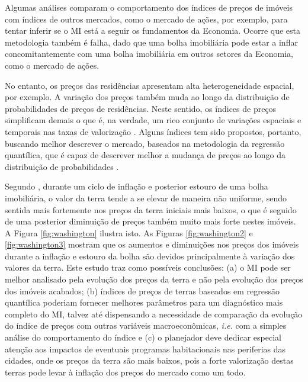 \documentclass[
	12pt,				%
	oneside,			%
	a4paper,			%
	chapter=TITLE,		%
	section=TITLE,		%
	english,			%
	brazil				%
	]{abntex2}
\begin{document}
\begin{refsection}
Algumas análises comparam o comportamento dos índices de preços de imóveis com
índices de outros mercados, como o mercado de ações, por exemplo, para tentar
inferir se o \gls{MI} está a seguir os fundamentos da Economia. Ocorre que esta
metodologia também é falha, dado que uma bolha imobiliária pode estar a inflar
concomitantemente com uma bolha imobiliária em outros setores da Economia, como
o mercado de ações.

No entanto, os preços das residências apresentam alta heterogeneidade espacial,
por exemplo. A variação dos preços também muda ao longo da distribuição de
probabilidades de preços de residências. Neste sentido, os índices de preços
simplificam demais o que é, na verdade, um rico conjunto de variações espaciais
e temporais nas taxas de valorização \autocite{McMillen2014LocalQH}. Alguns índices tem
sido propostos, portanto, buscando melhor descrever o mercado, baseados na
metodologia da regressão quantílica, que é capaz de descrever melhor a mudança
de preços ao longo da distribuição de probabilidades \autocites[ver][]{Wen}{ZHANG201785}{Coulson}.

Segundo \textcite[pp.~16-17]{washington}, durante um ciclo de inflação e posterior
estouro de uma bolha imobiliária, o valor da terra tende a
se elevar de maneira não uniforme, sendo sentida mais fortemente nos preços da
terra iniciais mais baixos, o que é seguido de uma posterior diminuição de
preços também muito mais forte nestes imóveis. A Figura \ref{fig:washington}
ilustra isto. As Figuras \ref{fig:washington2} e \ref{fig:washington3} mostram
que os aumentos e diminuições nos preços dos imóveis durante a inflação e
estouro da bolha são devidos principalmente à variação dos valores da terra.
Este estudo traz como possíveis conclusões: (a) o \gls{MI} pode ser melhor
analisado pela evolução dos preços da terra e não pela evolução dos preços dos
imóveis acabados; (b) índices de preços de terras baseados em regressão
quantílica poderiam fornecer melhores parâmetros para um diagnóstico mais
completo do \gls{MI}, talvez até dispensando a necessidade de comparação da
evolução do índice de preços com outras variáveis macroeconômicas, \emph{i.e.} com a
simples análise do comportamento do índice e (c) o planejador deve dedicar
especial atenção aos impactos de eventuais programas habitacionais nas
periferias das cidades, onde os preços da terra são mais baixos, pois a forte
valorização destas terras pode levar à inflação dos preços do mercado como um
todo.
\begin{figure}[H]


\end{figure}
\end{refsection}
\end{document}
